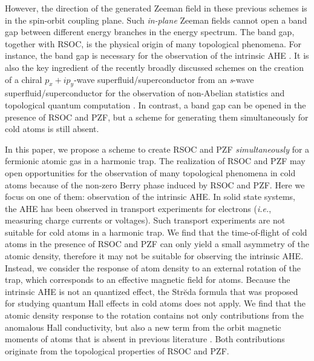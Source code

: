\documentclass[pra,twocolumn,showpacs,floatfix]{revtex4-1}
\begin{document}
However, the direction of the generated Zeeman field in these previous
schemes \cite{Ruseckas,Liu2,Ruseckas2,Clark1,Clark2,Zhang} is in the
spin-orbit coupling plane. Such \textit{in-plane} Zeeman fields cannot open
a band gap between different energy branches in the energy spectrum. The
band gap, together with RSOC, is the physical origin of many topological
phenomena. For instance, the band gap is necessary for the observation of
the intrinsic AHE \cite{Niu1}. It is also the key ingredient of the recently
broadly discussed schemes on the creation of a chiral $p_{x}+ip_{y}$-wave
superfluid/superconductor from an \textit{s}-wave superfluid/superconductor
\cite{Zhangcw,Sau} for the observation of non-Abelian statistics and
topological quantum computation \cite{Nayak}. In contrast, a band gap can be
opened in the presence of RSOC and PZF, but a scheme for generating them
simultaneously for cold atoms is still absent.

In this paper, we propose a scheme to create RSOC and PZF \textit{%
simultaneously} for a fermionic atomic gas in a harmonic trap. The
realization of RSOC and PZF may open opportunities for the observation of
many topological phenomena in cold atoms because of the non-zero Berry phase
induced by RSOC and PZF. Here we focus on one of them: observation of the
intrinsic AHE. In solid state systems, the AHE has been observed in
transport experiments for electrons (\textit{i.e.}, measuring charge
currents or voltages). Such transport experiments are not suitable for cold
atoms in a harmonic trap. We find that the time-of-flight of cold atoms in
the presence of RSOC and PZF can only yield a small asymmetry of the atomic
density, therefore it may not be suitable for observing the intrinsic AHE.
Instead, we consider the response of atom density to an external rotation of
the trap, which corresponds to an effective magnetic field for atoms.
Because the intrinsic AHE is not an quantized effect, the Str\u{e}da formula
\cite{Streda} that was proposed for studying quantum Hall effects in cold
atoms \cite{Zhai} does not apply. We find that the atomic density response
to the rotation contains not only contributions from the anomalous Hall
conductivity, but also a new term from the orbit magnetic moments of atoms
that is absent in previous literature \cite{Xiao}. Both contributions
originate from the topological properties of RSOC and PZF.
\end{document}
